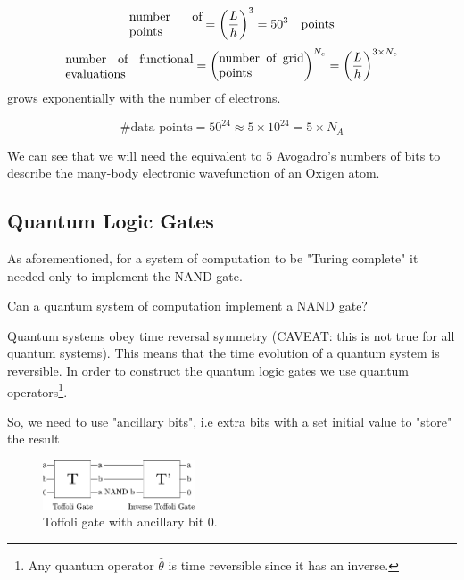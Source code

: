 \documentclass[10pt]{article}
\numberwithin{equation}{section}
\theoremstyle{defi}
\begin{document}
  \begin{equation*}
    \parbox{0.17\textwidth}{number of points} = \left(\frac{L}{h}\right)^3 = 50^3 \quad \text{points}
  \end{equation*}
\begin{equation*}
  \parbox{0.3\textwidth}{number of functional evaluations} = \left(\parbox{0.2\textwidth}{number of grid points}\right)^{N_e} = \left(\frac{L}{h}  \right)^{3\times N_e}
\end{equation*}
grows exponentially with the number of electrons. 

\begin{equation*}
 \# \text{data points} = 50^{24} \approx 5 \times 10^{24} = 5\times N_A
\end{equation*}

We can see that we will need the equivalent to $5$ Avogadro's numbers of bits to describe the many-body electronic wavefunction of an Oxigen atom.

\subsection{Quantum Logic Gates}
As aforementioned, for a system of computation to be "Turing complete" it needed only to implement the NAND gate. 
\begin{question}
  Can a quantum system of computation implement a NAND  gate?
\end{question}
Quantum systems obey time reversal symmetry (CAVEAT: this is not true for all quantum systems). This means that the time evolution of a quantum system is reversible. In order to construct the quantum logic gates we use quantum operators\footnote{Any quantum operator $\hat{\theta}$ is time reversible since it has an inverse.}.

So, we need to use "ancillary bits", i.e extra bits with a set initial value to "store" the result

\begin{figure}[H]
  \centering
  \includegraphics[width=0.4\textwidth]{toffoli-gate.pdf}
  \caption{Toffoli gate with ancillary bit 0.}
  \label{fig:toffoli-gate}
\end{figure}
\end{document}

